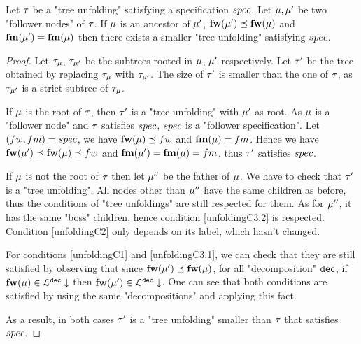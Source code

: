 \begin{lemma}
	\label{lem:increasing-followers}
	Let $\tau$ be a "tree unfolding" satisfying a specification $\spec$.
	Let $\mu, \mu'$ be two "follower nodes" of $\tau$.
	If $\mu$ is an ancestor of $\mu'$, $\mathbf{fw}(\mu') \preceq \mathbf{fw}(\mu)$ and $\mathbf{fm}(\mu')=\mathbf{fm}(\mu)$ then there exists a smaller "tree unfolding" satisfying $\spec$. 
\end{lemma}

\ifproofs
\begin{proof}
	Let $\tau_{\mu}$, $\tau_{\mu'}$ be the subtrees rooted in $\mu$, $\mu'$ respectively. 
	Let $\tau'$ be the tree obtained by replacing $\tau_{\mu}$ with $\tau_{\mu'}$. The size of $\tau'$ is smaller than the one of $\tau$, as $\tau_{\mu'}$ is a strict subtree of $\tau_{\mu}$.
	
	If $\mu$ is the root of $\tau$, then $\tau'$ is a "tree unfolding" with $\mu'$ as root. As $\mu$ is a "follower node" and $\tau$ satisfies $\spec$, $\spec$ is a "follower specification". Let $(\followwordspec, \followmessagespec) = \spec$, we have $\followlabelword{\node} \subword \followwordspec$ and $\followlabelmessage{\node} = \followmessagespec$. 
	Hence we have $\followlabelword{\node'} \subword \followlabelword{\node} \subword \followwordspec $ and $\followlabelmessage{\node'} = \followlabelmessage{\node} = \followmessagespec$, thus $\tau'$ satisfies $\spec$.
	
	If  $\mu$ is not the root of $\tau$ then let $\mu''$ be the father of $\mu$. We have to check that $\tau'$ is a "tree unfolding". 
	All nodes other than $\mu''$ have the same children as before, thus the conditions of "tree unfoldings" are still respected for them.
	As for $\mu''$, it has the same "boss" children, hence condition \ref{unfoldingC3.2} is respected. Condition \ref{unfoldingC2} only depends on its label, which hasn't changed.
	
	For conditions \ref{unfoldingC1} and \ref{unfoldingC3.1}, we can check that they are still satisfied by observing that since $\mathbf{fw}(\mu') \preceq \mathbf{fw}(\mu)$, for all "decomposition" $\mathtt{dec}$, if $\mathbf{fw}(\mu) \in \mathcal{L}^{\mathtt{\mathtt{dec}}}\downarrow$ then $\mathbf{fw}(\mu') \in \mathcal{L}^{\mathtt{\mathtt{dec}}}\downarrow$. One can see that both conditions are satisfied by using the same "decompositions" and applying this fact.
	
	As a result, in both cases $\tau'$ is a "tree unfolding" smaller than $\tau$ that satisfies $\spec$. 
\end{proof}
\fi


